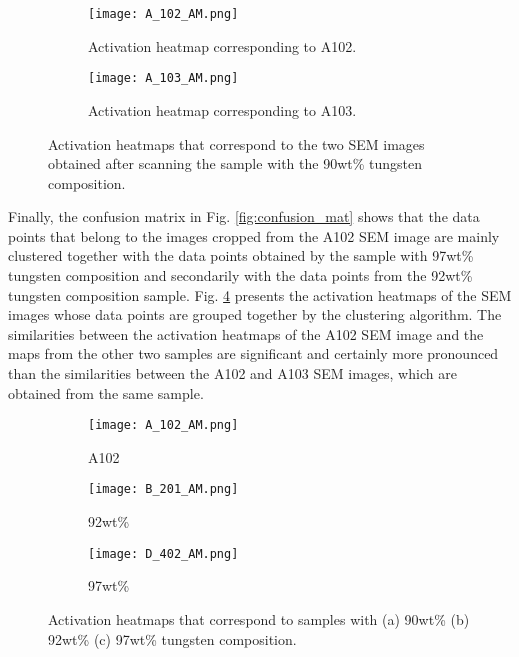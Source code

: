 \documentclass[authoryear,preprint,review,12pt, singleside]{elsarticle}
\begin{document}
\begin{figure}[!h]
	\centering
	\begin{subfigure}[b]{0.49\textwidth}
		\centering
		\texttt{[image: A\_102\_AM.png]}
		\caption{Activation heatmap corresponding to A102.}
		\label{fig:A_102_am}
	\end{subfigure}
	\begin{subfigure}[b]{0.49\textwidth}
		\centering
		\texttt{[image: A\_103\_AM.png]}
		\caption{Activation heatmap corresponding to A103.}
		\label{fig:A_103_am}
	\end{subfigure}
	\caption{Activation heatmaps that correspond to the two SEM images obtained after scanning the sample with the 90wt\% tungsten composition.}
	\label{fig:A_activ}
\end{figure}


Finally, the confusion matrix in Fig. \ref{fig:confusion_mat} shows that the data points that belong to the images cropped from the A102 SEM image are mainly clustered together with the data points obtained by the sample with 97wt\% tungsten composition and secondarily with the data points from the 92wt\% tungsten composition sample. Fig. \ref{fig:ABD_activ} presents the activation heatmaps of the SEM images whose data points are grouped together by the clustering algorithm. The similarities between the activation heatmaps of the A102 SEM image and the maps from the other two samples are significant and certainly more pronounced than the similarities between the A102 and A103 SEM images, which are obtained from the same sample.   


\begin{figure}[!h]
	\centering
	\begin{subfigure}[b]{0.45\textwidth}
		\centering
		\texttt{[image: A\_102\_AM.png]}
		\caption{A102}
	\end{subfigure}
	\begin{subfigure}[b]{0.45\textwidth}
		\centering
		\texttt{[image: B\_201\_AM.png]}
		\caption{92wt\%}
	\end{subfigure}
	\begin{subfigure}[b]{0.45\textwidth}
		\centering
		\texttt{[image: D\_402\_AM.png]}
		\caption{97wt\% }
	\end{subfigure}
	\caption{Activation heatmaps that correspond to samples with (a) 90wt\% (b) 92wt\% (c) 97wt\% tungsten composition.}
	\label{fig:ABD_activ}
\end{figure}
\end{document}
